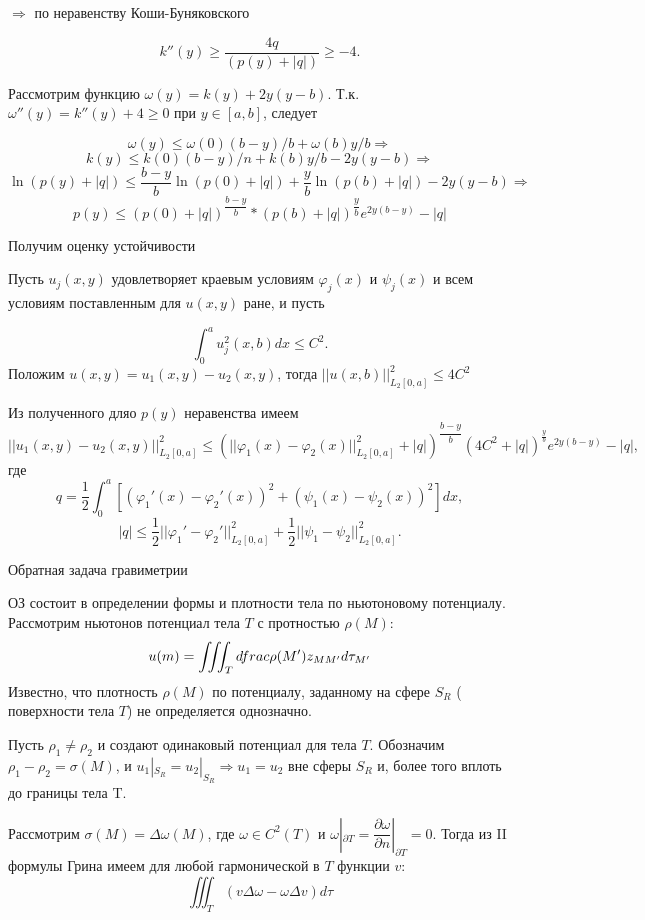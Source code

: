 \documentclass{article}
\begin{document}
$\Rightarrow $ по неравенству Коши-Буняковского

\[
k''(y) \geqslant \dfrac{4q}{(p(y) + |q|)} \geqslant -4.
\]

Рассмотрим функцию $\omega(y) = k(y) + 2y(y-b)$. Т.к. $\omega '' (y) = k''(y) + 4 \geqslant 0 $ при $y \in [a,b]$, следует

\[
\omega(y) \leqslant \omega(0)(b-y)/b + \omega(b)y/b \Rightarrow
\]
\[
k(y) \leqslant k(0)(b-y)/n + k(b) y/b - 2y(y-b) \Rightarrow
\]
\[
\ln (p(y) +|q|) \leqslant \dfrac{b-y}{b} \ln (p(0) + |q|) + \frac{y}{b} \ln(p(b) +|q|) - 2y(y-b) \Rightarrow
\]
\[
p(y) \leqslant (p(0) + |q|)^{\dfrac{b-y}{b}} * (p(b) +|q|)^{\dfrac{y}{b}} e^{2y(b-y)} - |q|
\]

Получим оценку устойчивости

Пусть $u_j(x,y)$ удовлетворяет краевым условиям $\varphi_j(x)$ и $\psi_j(x)$ и всем условиям поставленным для $u(x,y)$ ране, и пусть

\[
\int_0^a u_j^2(x,b)dx \leqslant C^2.
\]
Положим $u(x,y) = u_1(x,y) - u_2(x,y)$, тогда  $|| u(x,b)||_{L_2[0,a]}^2 \leqslant 4 C^2$

Из полученного дляо $p(y)$ неравенства имеем
\[
||u_1(x,y) - u_2(x,y) ||_{L_2[0,a]}^2 \leqslant (|| \varphi_1(x) - \varphi_2(x)||_{L_2[0,a]}^2 + |q|) ^{\dfrac{b-y}{b}} (4C^2 +|q|)^{\frac{y}{b}} e^{2y(b-y)} - |q|,
\]
где
\[
q = \dfrac{1}{2} \int_0^a [(\varphi_1'(x) - \varphi_2'(x))^2 + (\psi_1(x) - \psi_2(x))^2 ] dx,
\]
\[
|q| \leqslant \dfrac{1}{2} ||\varphi_1' - \varphi_2'||_{L_2[0,a]}^2 + \dfrac{1}{2} ||\psi_1 - \psi_2||_{L_2[0,a]}^2.
\]


\vspace{1cm}
\centerline{\large Обратная задача гравиметрии}

ОЗ состоит в определении формы и плотности тела по ньютоновому потенциалу. Рассмотрим ньютонов потенциал тела $T$ с протностью $\rho(M)$:
\[
u(m) = \iiint_T \\dfrac{\rho(M')}{z_{MM'}}d\tau_{M'}
\]
Известно, что плотность $\rho(M)$ по потенциалу, заданному на сфере $S_R$ ( поверхности тела $T$) не определяется однозначно.

Пусть $\rho_1 \neq \rho_2$ и создают одинаковый потенциал для тела $T$. Обозначим $\rho_1 - \rho_2 = \sigma(M)$, и $u_1|_S_R = u_2|_S_R \Rightarrow u_1 = u_2$ вне сферы $S_R$ и, более того вплоть до границы тела T.

Рассмотрим $\sigma(M) = \Delta \omega(M)$, где $ \omega \in C^2(T)$ и $\omega|_{\partial T} = \dfrac{\partial \omega}{\partial n}|_{\partial T} = 0$. Тогда из II формулы Грина имеем для любой гармонической в $T$ функции $v$: 
\[
\iiint_T (v \Delta \omega - \omega \Delta v) d\tau
\]
\end{document}

